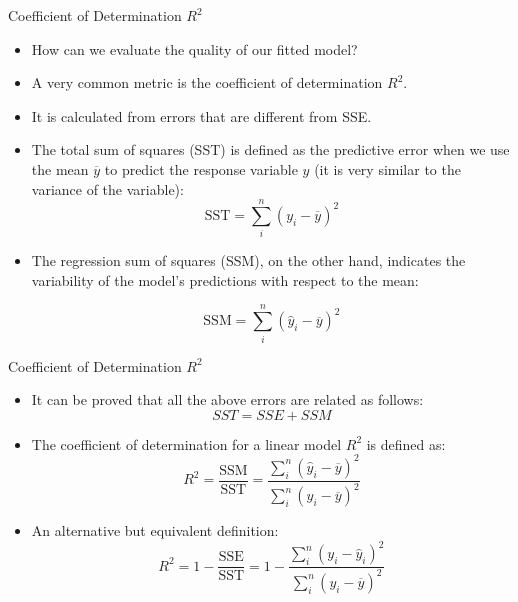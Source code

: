 \documentclass[handout]{beamer}
\begin{document}
\begin{frame}{Coefficient of Determination $R^2$}
\scriptsize{
\begin{itemize}
 \item  How can we evaluate the quality of our fitted model?
 \item A very common metric is the coefficient of determination $R^2$. 
 \item  It is calculated from errors that are different from SSE.
 \item The total sum of squares (SST)  is defined as the predictive error when we use the mean $\overline{y}$  to predict the response variable $y$ (it is very similar to the variance of the variable):
 \begin{displaymath}
  \text{SST} = \sum_{i}^{n}(y_i-\overline{y})^2  
 \end{displaymath}
 \item  The regression sum of squares (SSM), on the other hand, indicates the variability of the model's predictions with respect to the mean:

 \begin{displaymath}
  \text{SSM} = \sum_{i}^{n}(\hat{y}_i-\overline{y})^2 
 \end{displaymath}
  
 
 
  
\end{itemize}

}
\end{frame}

\begin{frame}{Coefficient of Determination $R^2$}
\scriptsize{
\begin{itemize}
 \item It can be proved that all the above errors are related as follows: \begin{equation}
 SST = SSE + SSM                                                 
    \end{equation}


 \item The coefficient of determination for a linear model $R^2$ is defined as:
 \begin{equation}
  R^2= \frac{\text{SSM}}{\text{SST}} = \frac{\sum_{i}^{n}(\hat{y}_i-\overline{y})^2 }{\sum_{i}^{n}(y_i-\overline{y})^2  }
 \end{equation}
 
 \item An alternative but equivalent definition:
  \begin{equation}
  R^2= 1-\frac{\text{SSE}}{\text{SST}} = 1- \frac{\sum_{i}^{n}(y_i-\hat{y}_i)^2 }{\sum_{i}^{n}(y_i-\overline{y})^2  }
  \label{eq:r2}
 \end{equation}
 

  
\end{itemize}


}
\end{frame}
\end{document}
